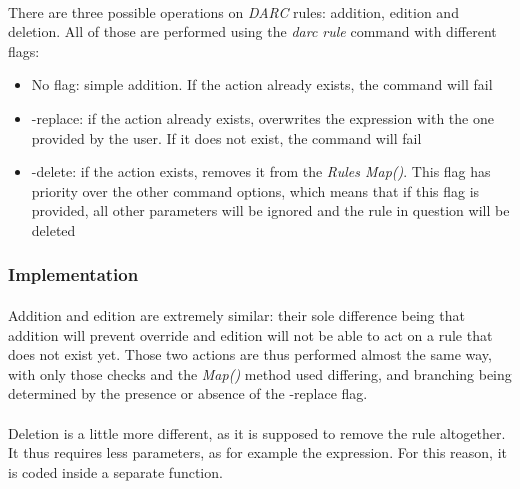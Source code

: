 \paragraph{}

There are three possible operations on \textit{DARC} rules: addition, edition and deletion. All of those are performed using the \textit{darc rule} command with different flags:

\begin{itemize}
    \item No flag: simple addition. If the action already exists, the command will fail
    \item -replace: if the action already exists, overwrites the expression with the one provided by the user. If it does not exist, the command will fail
    \item -delete: if the action exists, removes it from the \textit{Rules Map()}. This flag has priority over the other command options, which means that if this flag is provided, all other parameters will be ignored and the rule in question will be deleted
\end{itemize}

\subsubsection{Implementation}

\paragraph{}

Addition and edition are extremely similar: their sole difference being that addition will prevent override and edition will not be able to act on a rule that does not exist yet. Those two actions are thus performed almost the same way, with only those checks and the \textit{Map()} method used differing, and branching being determined by the presence or absence of the -replace flag.

\paragraph{}

Deletion is a little more different, as it is supposed to remove the rule altogether. It thus requires less parameters, as for example the expression. For this reason, it is coded inside a separate function.

\paragraph{}

